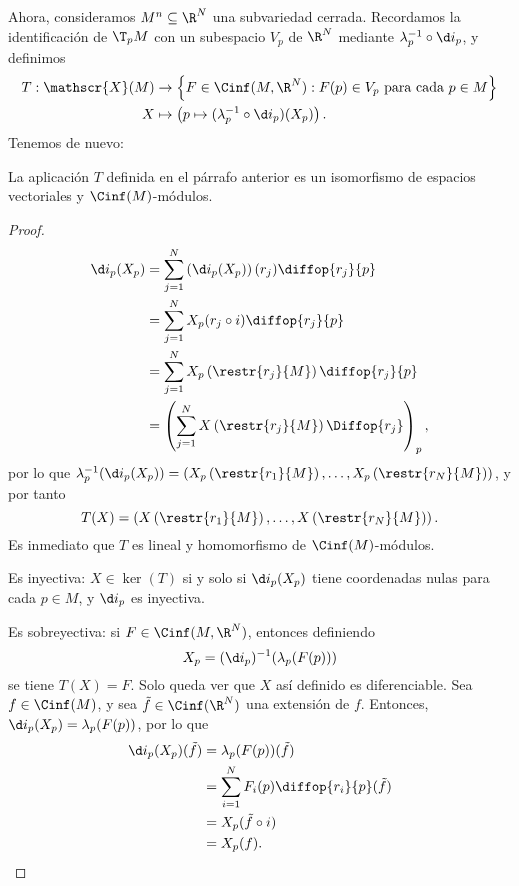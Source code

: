 Ahora, consideramos $M^{n}\subseteq \R^{N}$ una subvariedad cerrada. Recordamos
la identificación de $\T_{p}M$ con un subespacio $V_{p}$ de $\R^{N}$ mediante
$\lambda_{p}^{-1}\circ\d i_{p}$, y definimos
\begin{alignat*}{2}
  T: \mathscr{X}(M) & \to \left\{ F\in\Cinf(M,\R^{N}) : F(p)\in V_{p}\text{ para
      cada } p\in M \right\} \\
 X & \mapsto \left(p\mapsto (\lambda_{p}^{-1}\circ\d i_{p})(X_{p}) \right).
\end{alignat*}
Tenemos de nuevo:
\begin{nprop}
  La aplicación $T$ definida en el párrafo anterior es un isomorfismo de
  espacios vectoriales y $\Cinf(M)$-módulos.
\end{nprop}
\begin{proof}
  \begin{align*}
    \d i_{p}(X_{p}) & = \sum_{j=1}^{N} \left(\d i_{p}(X_{p})\right)(r_{j})
                      \diffop{r_{j}}{p} \\
                    & = \sum_{j=1}^{N}X_{p}(r_{j}\circ i) \diffop{r_{j}}{p} \\
                    & = \sum_{j=1}^{N} X_{p}\left(\restr{r_{j}}{M}\right) \diffop{r_{j}}{p}
    \\
                    & = \left( \sum_{j=1}^{N}X\left(\restr{r_{j}}{M}\right)\Diffop{r_{j}} \right)_{p},
  \end{align*}
  por lo que $\lambda_{p}^{-1}(\d i_{p}(X_{p})) = \left(X_{p}\left(\restr{r_{1}}{M}\right),
  \dots, X_{p}\left(\restr{r_{N}}{M}\right)\right)$, y por tanto
  \[
    T(X) = \left(X\left(\restr{r_{1}}{M}\right), \dots, X\left(\restr{r_{N}}{M}\right)\right)
    .\]
  Es inmediato que $T$ es lineal y homomorfismo de $\Cinf(M)$-módulos.

  Es inyectiva: $X\in\ker(T)$ si y solo si $\d i_{p}(X_{p})$ tiene coordenadas
  nulas para cada $p\in M$, y $\d i_{p}$ es inyectiva. 

  Es sobreyectiva: si $F\in\Cinf(M,\R^{N})$, entonces definiendo
  \[
    X_{p} = (\d i_{p})^{-1}(\lambda_{p}(F(p)))
  \]
  se tiene $T(X)=F$. Solo queda ver que $X$ así definido es diferenciable. Sea
  $f\in\Cinf(M)$, y sea $\tilde{f}\in\Cinf(\R^{N})$ una extensión de
  $f$. Entonces, $\d i_{p}(X_{p}) = \lambda_{p}(F(p))$, por lo que
  \begin{align*}
    \d i_{p}(X_{p})(\tilde{f}) & = \lambda_{p}(F(p))(\tilde{f}) \\
                    & = \sum_{i=1}^{N}F_{i}(p) \diffop{r_{i}}{p}(\tilde{f}) \\
                    & = X_{p}(\tilde{f}\circ i) \\
                    & = X_{p}(f).
  \end{align*}
\end{proof}

